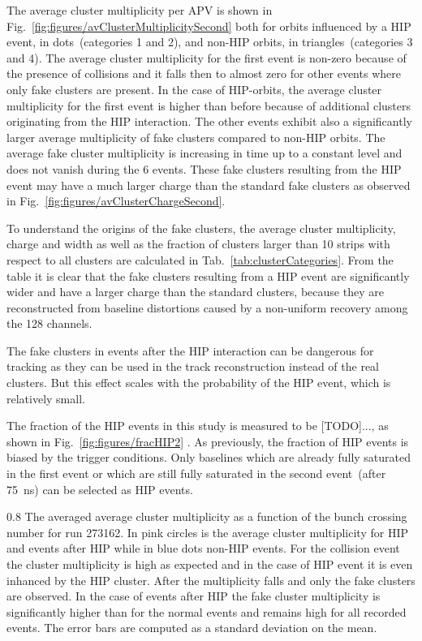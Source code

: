 The average cluster multiplicity per APV is shown in Fig.~\ref{fig:figures/avClusterMultiplicitySecond} both for orbits influenced by a HIP event, in dots~(categories 1 and 2), and non-HIP orbits, in triangles~(categories 3 and 4). The average cluster multiplicity for the first event is non-zero because of the presence of collisions and it falls then to almost zero for other events where only fake clusters are present. In the case of HIP-orbits, the average cluster multiplicity for the first event is higher than before because of additional clusters originating from the HIP interaction. The other events exhibit also a significantly larger average multiplicity of fake clusters compared to non-HIP orbits. The average fake cluster multiplicity is increasing in time up to a constant level and does not vanish during the 6 events. These fake clusters resulting from the HIP event may have a much larger charge than the standard fake clusters as observed in Fig.~\ref{fig:figures/avClusterChargeSecond}. 

To understand the origins of the fake clusters, the average cluster multiplicity, charge and width as well as the fraction of clusters larger than 10 strips with respect to all clusters are calculated in Tab.~\ref{tab:clusterCategories}. From the table it is clear that the fake clusters resulting from a HIP event are significantly wider and have a larger charge than the standard clusters, because they are reconstructed from baseline distortions caused by a non-uniform recovery among the 128 channels.

The fake clusters in events after the HIP interaction can be dangerous for tracking as they can be used in the track reconstruction instead of the real clusters. But this effect scales with the probability of the HIP event, which is relatively small.

The fraction of the HIP events in this study is measured to be [TODO]..., as shown in Fig.~\ref{fig:figures/fracHIP2} . As previously, the fraction of HIP events is biased by the trigger conditions. Only baselines which are already fully saturated in the first event or which are still fully saturated in the second event~(after 75~ns) can be selected as HIP events.


                 {0.8}       %
                 {The averaged average cluster multiplicity as a function of the bunch crossing number for run 273162. In pink circles is the average cluster multiplicity for HIP and events after HIP while in blue dots non-HIP events. For the collision event the cluster multiplicity is high as expected and in the case of HIP event it is even inhanced by the HIP cluster. After the multiplicity falls and only the fake clusters are observed. In the case of events after HIP the fake cluster multiplicity is significantly higher than for the normal events and remains high for all recorded events. The error bars are computed as a standard deviation on the mean. } %

